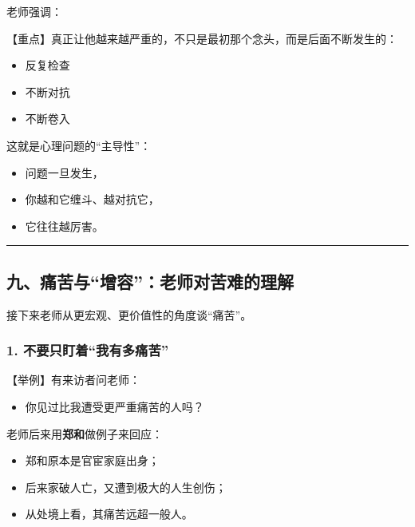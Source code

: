 \documentclass[
  chinese,
  9pt,
  a4paper,
]{ctexart}
\providecommand{\tightlist}{%
  \setlength{\itemsep}{0pt}\setlength{\parskip}{0pt}}
\begin{document}
老师强调：

【重点】真正让他越来越严重的，不只是最初那个念头，而是后面不断发生的：

\begin{itemize}
\tightlist
\item
  反复检查
\item
  不断对抗
\item
  不断卷入
\end{itemize}

这就是心理问题的``主导性''：

\begin{itemize}
\tightlist
\item
  问题一旦发生，
\item
  你越和它缠斗、越对抗它，
\item
  它往往越厉害。
\end{itemize}

\begin{center}\rule{0.5\linewidth}{0.5pt}\end{center}

\subsection{九、痛苦与``增容''：老师对苦难的理解}\label{ux4e5dux75dbux82e6ux4e0eux589eux5bb9ux8001ux5e08ux5bf9ux82e6ux96beux7684ux7406ux89e3}

接下来老师从更宏观、更价值性的角度谈``痛苦''。

\subsubsection{1.
不要只盯着``我有多痛苦''}\label{ux4e0dux8981ux53eaux76efux7740ux6211ux6709ux591aux75dbux82e6}

【举例】有来访者问老师：

\begin{itemize}
\tightlist
\item
  你见过比我遭受更严重痛苦的人吗？
\end{itemize}

老师后来用\textbf{郑和}做例子来回应：

\begin{itemize}
\tightlist
\item
  郑和原本是官宦家庭出身；
\item
  后来家破人亡，又遭到极大的人生创伤；
\item
  从处境上看，其痛苦远超一般人。
\end{itemize}
\end{document}
